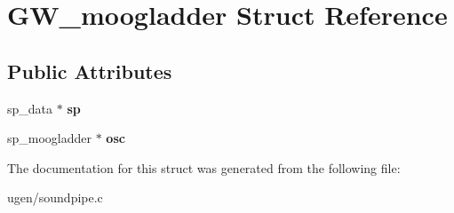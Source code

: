 \hypertarget{structGW__moogladder}{}\section{G\+W\+\_\+moogladder Struct Reference}
\label{structGW__moogladder}
\subsection*{Public Attributes}
\begin{DoxyCompactItemize}
\item 
\hypertarget{structGW__moogladder_af8be8185b1675c0bbdf6ebf0d5560d72}{}\label{structGW__moogladder_af8be8185b1675c0bbdf6ebf0d5560d72} 
sp\+\_\+data $\ast$ {\bfseries sp}
\item 
\hypertarget{structGW__moogladder_ad0c9b261135a5c46968fef90cb495a21}{}\label{structGW__moogladder_ad0c9b261135a5c46968fef90cb495a21} 
sp\+\_\+moogladder $\ast$ {\bfseries osc}
\end{DoxyCompactItemize}


The documentation for this struct was generated from the following file\+:\begin{DoxyCompactItemize}
\item 
ugen/soundpipe.\+c\end{DoxyCompactItemize}
